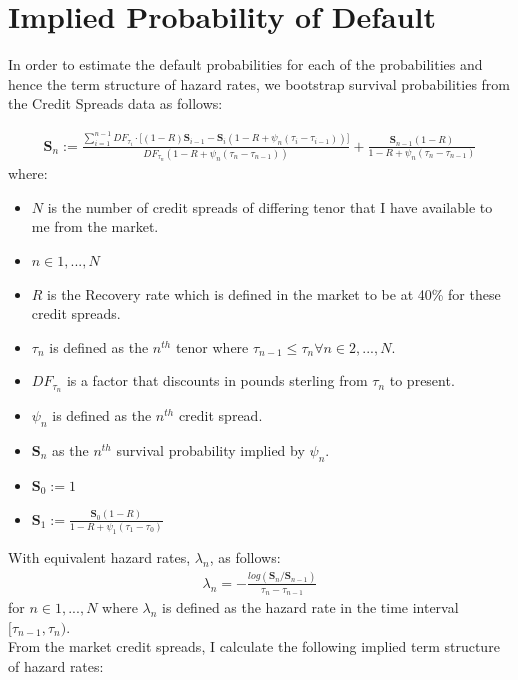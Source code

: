 \documentclass{report}
\theoremstyle{plain}
\theoremstyle{definition}
\begin{document}
\chapter{Implied Probability of Default}
In order to estimate the default probabilities for each of the probabilities and hence the term structure of hazard rates, we bootstrap survival probabilities from the Credit Spreads data as follows:

\begin{align*}
\mathbf{S}_n := \frac{\sum_{i=1}^{n-1}DF_{\tau_i} \cdot \Big[ (1-R)\mathbf{S}_{i-1} - \mathbf{S}_{i}(1 - R + \psi_n(\tau_i - \tau_{i-1}))  \Big]  }{ DF_{\tau_n} (1 - R + \psi_n(\tau_n - \tau_{n-1})) } + \frac{\mathbf{S}_{n-1}(1-R)}{1 - R + \psi_n(\tau_n - \tau_{n-1})}
\end{align*}
where:
\begin{itemize}
	\item $N$ is the number of credit spreads of differing tenor that I have available to me from the market.
	\item $n \in {1,...,N}$ 
	\item $R$ is the Recovery rate which is defined in the market to be at 40\% for these credit spreads.
	\item $\tau_n$ is defined as the $n^{th}$ tenor where $\tau_{n-1} \le \tau_{n} \forall n \in {2,...,N}$.
	\item $DF_{\tau_n}$ is a factor that discounts in pounds sterling from $\tau_n$ to present.
	\item $\psi_n$ is defined as the $n^{th}$ credit spread.
	\item $\mathbf{S}_n$ as the $n^{th}$ survival probability implied by $\psi_n$.
	\item $\mathbf{S}_0 := 1$ 
	\item $\mathbf{S}_1 := \frac{\mathbf{S}_{0}(1-R)}{1 - R + \psi_1(\tau_1 - \tau_{0})}$ 
\end{itemize}

With equivalent hazard rates, $\lambda_n$, as follows:
\begin{align*}
\lambda_n = -\frac{log(\mathbf{S}_n/\mathbf{S}_{n-1})}{\tau_{n} - \tau_{n-1}}
\end{align*}
for $n \in {1,...,N}$ where $\lambda_n$ is defined as the hazard rate in the time interval $[\tau_{n-1},\tau_n)$.\\

From the market credit spreads, I calculate the following implied term structure of hazard rates:
\end{document}
